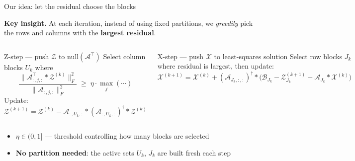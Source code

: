 \documentclass[aspectratio=169,10pt]{beamer}
\def\fm#1{\mathcal{#1}}
\begin{document}
\begin{frame}{Our idea: let the residual choose the blocks}

  \textbf{Key insight.} At each iteration, instead of using fixed partitions,
  we \emph{greedily} pick the rows and columns with the \textbf{largest residual}.

  \bigskip
  \begin{columns}[T]
      \begin{block}{Z-step — push $\fm{Z}$ to null$(\fm{A}^\top)$}
        Select column blocks $U_k$ where
        \[
          \frac{\|\fm{A}_{:,j,:}^\top * \fm{Z}^{(k)}\|_F^2}
               {\|\fm{A}_{:,j,:}\|_F^2}
          \;\geq\; \eta \cdot \max_j(\cdots)
        \]
        Update: $\fm{Z}^{(k+1)} = \fm{Z}^{(k)} - \fm{A}_{:,U_k,:} *
        (\fm{A}_{:,U_k,:})^\dagger * \fm{Z}^{(k)}$
      \end{block}

      \begin{block}{X-step — push $\fm{X}$ to least-squares solution}
        Select row blocks $J_k$ where residual is largest, then update:
        \[
          \fm{X}^{(k+1)} = \fm{X}^{(k)} + (\fm{A}_{J_k,:,:})^\dagger *
          \bigl(\fm{B}_{J_k} - \fm{Z}^{(k+1)}_{J_k} - \fm{A}_{J_k}*\fm{X}^{(k)}\bigr)
        \]
      \end{block}
  \end{columns}

  \bigskip
  \begin{itemize}
    \item $\eta \in (0,1]$ — threshold controlling how many blocks are selected
    \item \textbf{No partition needed}: the active sets $U_k$, $J_k$ are built fresh each step
  \end{itemize}

\end{frame}
\end{document}
